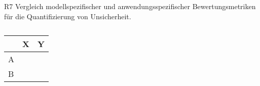 









R7 Vergleich modellspezifischer und anwendungsspezifischer Bewertungsmetriken für die Quantifizierung von Unsicherheit.


\begin{table}[htpb]
  \centering
  \begin{tabular}{|l|l|p{\dimexpr\textwidth-8cm-2\tabcolsep}|}  %
    \hline
    & \textbf{X} & \textbf{Y} \\
    \hline
    A & & \\
    \hline
    B & & \\
    \hline
  \end{tabular}
  \caption{}\label{tab:chapter6r7}
\end{table}














